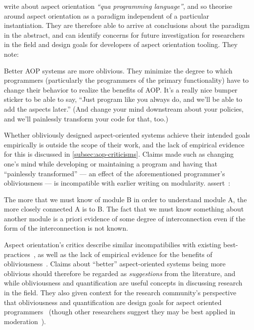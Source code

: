 \citeauthor{filman2000aspect} write about aspect orientation \emph{``qua
programming language''}, and so theorise around aspect orientation as a paradigm
independent of a particular instantiation. They are therefore able to arrive at
conclusions about the paradigm in the abstract, and can identify concerns for
future investigation for researchers in the field and design goals for
developers of aspect orientation tooling. They note:

\begin{blockquote}
Better AOP systems are more oblivious. They minimize the degree to which
programmers (particularly the programmers of the primary functionality) have to
change their behavior to realize the benefits of AOP. It's a really nice bumper
sticker to be able to say, ``Just program like you always do, and we'll be able
to add the aspects later.'' (And change your mind downstream about your
policies, and we'll painlessly transform your code for that, too.)
\end{blockquote}

Whether obliviously designed aspect-oriented systems achieve their intended
goals empirically is outside the scope of their work, and the lack of empirical
evidence for this is discussed in \cref{subsec:aop-criticisms}. Claims made such
as changing one's mind while developing or maintaining a program and having that
``painlessly transformed'' --- an effect of the aforementioned programmer's
obliviousness --- is incompatible with earlier writing on modularity.
\citeauthor{yourdon1979structured} assert~\cite{yourdon1979structured}: 

\begin{blockquote}
The more that we must know of module B in order to understand module A, the more closely connected A is to B. The fact that we must know something about another module is a priori evidence of some degree of interconnection even if the form of the interconnection is not known. 
\end{blockquote}

Aspect orientation's critics describe similar incompatibilies with existing
best-practices~\cite{przybylek2010wrong,Constantinides04aopconsidered}, as well
as the lack of empirical evidence for the benefits of
obliviousness~\cite{steimann06paradoxical}. Claims about ``better''
aspect-oriented systems being more oblivious should therefore be regarded as
\emph{suggestions} from the literature, and while obliviousness and
quantification are useful concepts in discussing research in the field. They
also given context for the research community's perspective that obliviousness
and quantification are design goals for aspect oriented
programmers~\cite{AspectCplusplusDesignImp,kell2008survey,aspect oriented
workflow} (though other researchers suggest they may be best applied in
moderation~\cite{leavens2007multiple}).

